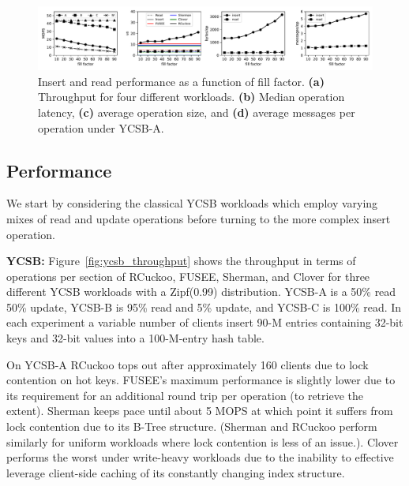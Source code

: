 
\begin{figure}[ht]
    \includegraphics[width=0.99\linewidth]{fig/hero_ycsb_fill.pdf}

    \caption{Insert and read performance as a
    function of fill factor. \textbf{(a)} Throughput for four different workloads. \textbf{(b)}
    Median operation latency, \textbf{(c)} average operation size, and \textbf{(d)}
    average messages per operation under YCSB-A.}

    \label{fig:ycsb_fill}
\end{figure}




\subsection{Performance}

We start by considering the classical YCSB workloads which employ
varying mixes of read and update operations before turning to the
more complex insert operation.

\textbf{YCSB:}
Figure~\ref{fig:ycsb_throughput} shows the throughput in terms of
operations per section of RCuckoo, FUSEE, Sherman, and Clover for
three different YCSB workloads with a Zipf(0.99) distribution. YCSB-A
is a 50\% read 50\% update, YCSB-B is 95\% read and 5\% update, and
YCSB-C is 100\% read.  In each experiment a variable number of clients
insert 90-M entries containing 32-bit keys and 32-bit values into a
100-M-entry hash table.


On YCSB-A RCuckoo tops out after approximately 160 clients due to lock
contention on hot keys.  FUSEE's maximum performance is slightly lower
due to its requirement for an additional round trip per operation (to
retrieve the extent). Sherman keeps pace until about 5 MOPS at which
point it suffers from lock contention due to its B-Tree structure.
(Sherman and RCuckoo perform similarly for uniform workloads where
lock contention is less of an issue.).  Clover performs the worst
under write-heavy workloads due to the inability to effective leverage
client-side caching of its constantly changing index structure.

